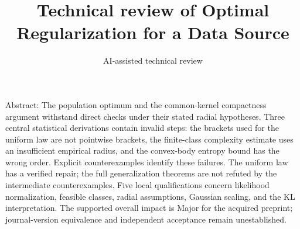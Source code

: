 \documentclass[10pt]{article}
\title{Technical review of
Optimal Regularization for a Data Source}
\author{AI-assisted technical review}
\date{}
\begin{document}
\maketitle
Abstract: The population optimum and the common-kernel compactness argument withstand direct checks under their stated radial hypotheses. Three central statistical derivations contain invalid steps: the brackets used for the uniform law are not pointwise brackets, the finite-class complexity estimate uses an insufficient empirical radius, and the convex-body entropy bound has the wrong order. Explicit counterexamples identify these failures. The uniform law has a verified repair; the full generalization theorems are not refuted by the intermediate counterexamples. Five local qualifications concern likelihood normalization, feasible classes, radial assumptions, Gaussian scaling, and the KL interpretation. The supported overall impact is Major for the acquired preprint; journal-version equivalence and independent acceptance remain unestablished.\par
\end{document}
